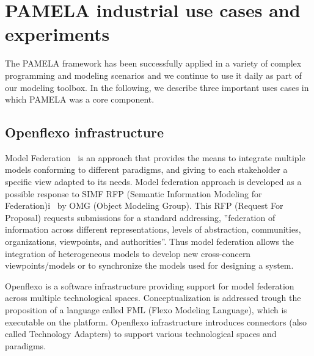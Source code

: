 


\section{PAMELA industrial use cases and experiments}
\label{sec:validation}

 The PAMELA framework has been successfully applied in a variety of complex programming and modeling scenarios and we continue to use it daily as part of our modeling toolbox. In the following, we describe three important uses cases in which PAMELA was a core component.



\subsection{Openflexo infrastructure}

Model Federation~\cite{Golra2016} is an approach that provides the means to
integrate multiple models conforming to different paradigms, and giving to each
stakeholder a specific view adapted to its needs. Model federation approach is
developed as a possible response to SIMF RFP (Semantic Information Modeling for
Federation)i~\cite{simf-rfp} by OMG (Object Modeling Group). This RFP (Request For Proposal)
requests submissions for a standard addressing, ”federation of information
across different representations, levels of abstraction, communities,
organizations, viewpoints, and authorities”. Thus model federation allows the
integration of heterogeneous models to develop new cross-concern
viewpoints/models or to synchronize the models used for designing a system. 

Openflexo\cite{OpenflexoWebSite} is a software infrastructure providing support
for model federation across multiple technological spaces. Conceptualization is
addressed trough the proposition of a language called FML (Flexo Modeling
Language), which is executable on the platform. Openflexo infrastructure
introduces connectors (also called Technology Adapters) to support various
technological spaces and paradigms.

